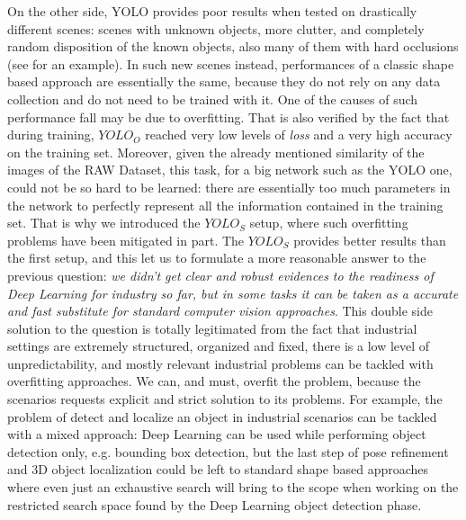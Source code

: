 
On the other side, YOLO provides poor results when tested on drastically different scenes: scenes with unknown objects, more clutter, and completely random disposition of the known objects, also many of them with hard occlusions (see  for an example). In such new scenes instead, performances of a classic shape based approach are essentially the same, because they do not rely on any data collection and do not need to be trained with it. One of the causes of such performance fall may be due to overfitting. That is also verified by the fact that during training, $YOLO_O$ reached very low levels of \emph{loss} and a very high accuracy on the training set. Moreover, given the already mentioned similarity of the images of the RAW Dataset, this task, for a big network such as the YOLO one, could not be so hard to be learned: there are essentially too much parameters in the network to perfectly represent all the information contained in the training set. That is why we introduced the $YOLO_S$ setup, where such overfitting problems have been mitigated in part. The $YOLO_S$ provides better results than the first setup, and this let us to formulate a more reasonable answer to the previous question: \emph{we didn't get clear and robust evidences to the readiness of Deep Learning for industry so far, but in some tasks it can be taken as a accurate and fast substitute for standard computer vision approaches}. This double side solution to the question is totally legitimated from the fact that industrial settings are extremely structured, organized and fixed, there is a low level of unpredictability, and mostly relevant industrial problems can be tackled with overfitting approaches. We can, and must, overfit the problem, because the scenarios requests explicit and strict solution to its problems. 
For example, the problem of detect and localize an object in industrial scenarios can be tackled with a mixed approach: Deep Learning can be used while performing object detection only, e.g. bounding box detection, but the last step of pose refinement and 3D object localization could be left to standard shape based approaches where even just an exhaustive search will bring to the scope when working on the restricted search space found by the Deep Learning object detection phase.